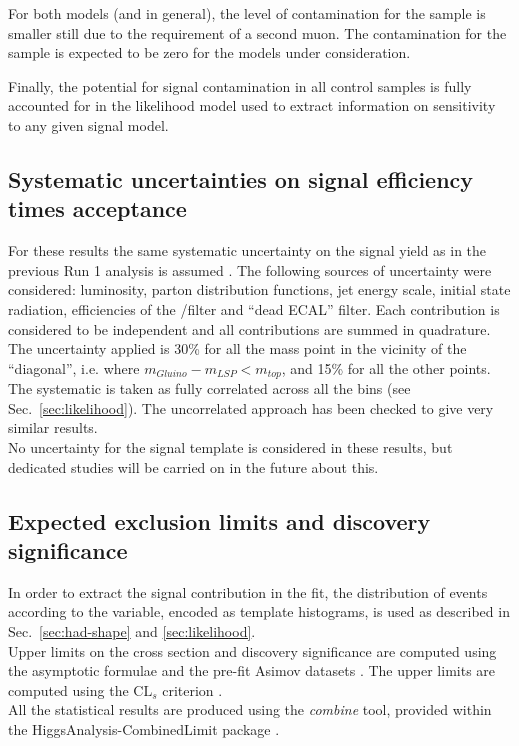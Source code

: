 For both models (and in general), the level of contamination for the
\mmj sample is smaller still due to the requirement of a second
muon. The contamination for the \gj sample is expected to be zero for
the models under consideration. 

Finally, the potential for signal contamination in all control samples
is fully accounted for in the likelihood model used to extract
information on sensitivity to any given signal model.

\subsection{Systematic uncertainties on signal efficiency times acceptance}
\label{sec:sig-syst}

For these results the same systematic uncertainty on the signal yield 
as in the previous Run 1 analysis is assumed \cite{CMS_AN_2013-366}. 
The following sources of uncertainty were considered: 
luminosity, parton distribution
functions, jet energy scale, initial state radiation, 
efficiencies of the \mht/\met filter and ``dead ECAL'' filter. 
Each contribution is considered to be independent and all contributions are
summed in quadrature. \\
The uncertainty applied is 30\% for all the mass point in the vicinity of the ``diagonal'', i.e. where $m_{Gluino}-m_{LSP}<m_{top}$, 
and 15\% for all the other points. 
The systematic is taken as fully correlated across all the bins (see Sec.~\ref{sec:likelihood}). 
The uncorrelated approach has been checked to give very similar results. \\
No uncertainty for the signal \MHT template is considered in these results, 
but dedicated studies will be carried on in the future about this.


\subsection{Expected exclusion limits and discovery significance}
\label{subsec:susy_results}

In order to extract the signal contribution in the fit, the distribution of events according to the \mht variable, 
encoded as template histograms, is used as described in Sec.~\ref{sec:had-shape} and \ref{sec:likelihood}. \\
Upper limits on the cross section and discovery significance are computed using the asymptotic formulae and the pre-fit Asimov datasets \cite{AsymptoticFormulae}. 
The upper limits are computed using the $\text{CL}_{s}$ criterion \cite{CLsTechnique}. \\
All the statistical results are produced using the \textit{combine} tool, 
provided within the HiggsAnalysis-CombinedLimit package \cite{Combine}. 

